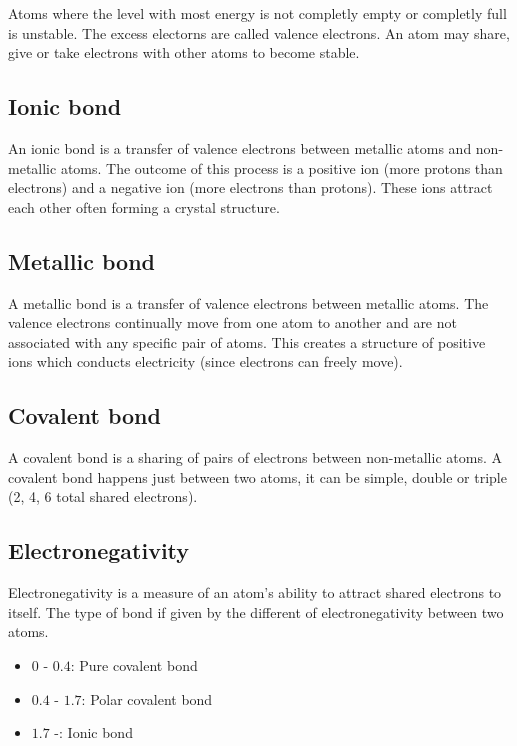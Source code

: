 \documentclass[a4paper]{article}
\begin{document}
Atoms where the level with most energy is not completly empty or completly full is unstable.
The excess electorns are called valence electrons. An atom may share, give or take electrons
with other atoms to become stable.

\subsection{Ionic bond}

An ionic bond is a transfer of valence electrons between metallic atoms and non-metallic atoms.
The outcome of this process is a positive ion (more protons than electrons)
and a negative ion (more electrons than protons). These ions attract each other often
forming a crystal structure.

\subsection{Metallic bond}

A metallic bond is a transfer of valence electrons between metallic atoms.
The valence electrons continually move from one atom to another and are not
associated with any specific pair of atoms. This creates a structure of positive ions
which conducts electricity (since electrons can freely move).

\subsection{Covalent bond}

A covalent bond is a sharing of pairs of electrons between non-metallic atoms.
A covalent bond happens just between two atoms, it can be simple, double or triple (2, 4, 6 total shared electrons).

\subsection{Electronegativity}

Electronegativity is a measure of an atom's ability to attract shared electrons to itself.
The type of bond if given by the different of electronegativity between two atoms.
\begin{itemize}
    \item \(0\) - \(0.4\): Pure covalent bond
    \item \(0.4\) - \(1.7\): Polar covalent bond
    \item \(1.7\) -: Ionic bond
\end{itemize}
\end{document}
